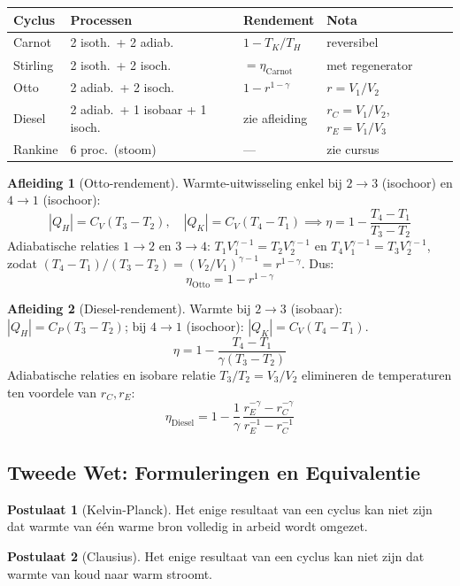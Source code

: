 \documentclass[a4paper,twoside,10pt]{article}
\theoremstyle{definition}
\newtheorem{postulate}{Postulaat}[section]
\newtheorem{derivation}{Afleiding}[section]
\begin{document}
\begin{center}
\renewcommand{\arraystretch}{1.2}
\begin{tabular}{@{}llll@{}}
\toprule
Cyclus   & Processen                           & Rendement             & Nota \\
\midrule
Carnot   & 2 isoth.\ + 2 adiab.                & $1 - T_K/T_H$         & reversibel \\
Stirling & 2 isoth.\ + 2 isoch.                & $= \eta_{\mathrm{Carnot}}$ & met regenerator \\
Otto     & 2 adiab.\ + 2 isoch.                & $1 - r^{1-\gamma}$    & $r=V_1/V_2$ \\
Diesel   & 2 adiab.\ + 1 isobaar + 1 isoch.    & zie afleiding         & $r_C=V_1/V_2$, $r_E=V_1/V_3$ \\
Rankine  & 6 proc.\ (stoom)                    & ---                   & zie cursus \\
\bottomrule
\end{tabular}
\end{center}

\begin{derivation}[Otto-rendement]
Warmte-uitwisseling enkel bij $2\to3$ (isochoor) en $4\to1$ (isochoor):
\[
  |Q_H| = C_V(T_3-T_2), \quad |Q_K| = C_V(T_4-T_1)
  \implies \eta = 1 - \frac{T_4-T_1}{T_3-T_2}
\]
Adiabatische relaties $1\to2$ en $3\to4$:
$T_1V_1^{\gamma-1}=T_2V_2^{\gamma-1}$ en $T_4V_1^{\gamma-1}=T_3V_2^{\gamma-1}$,
zodat $(T_4-T_1)/(T_3-T_2) = (V_2/V_1)^{\gamma-1} = r^{1-\gamma}$. Dus:
\[
  \boxed{\eta_{\mathrm{Otto}} = 1 - r^{1-\gamma}}
\]
\end{derivation}

\begin{derivation}[Diesel-rendement]
Warmte bij $2\to3$ (isobaar): $|Q_H|=C_P(T_3-T_2)$; bij $4\to1$ (isochoor): $|Q_K|=C_V(T_4-T_1)$.
\[
  \eta = 1 - \frac{T_4-T_1}{\gamma(T_3-T_2)}
\]
Adiabatische relaties en isobare relatie $T_3/T_2 = V_3/V_2$
elimineren de temperaturen ten voordele van $r_C, r_E$:
\[
  \boxed{\eta_{\mathrm{Diesel}} = 1 - \frac{1}{\gamma}\,\frac{r_E^{-\gamma}-r_C^{-\gamma}}{r_E^{-1}-r_C^{-1}}}
\]
\end{derivation}

\subsection{Tweede Wet: Formuleringen en Equivalentie}

\begin{postulate}[Kelvin-Planck]
Het enige resultaat van een cyclus kan niet zijn dat warmte van één warme bron
volledig in arbeid wordt omgezet.
\end{postulate}
\begin{postulate}[Clausius]
Het enige resultaat van een cyclus kan niet zijn dat warmte van koud naar warm stroomt.
\end{postulate}
\end{document}
